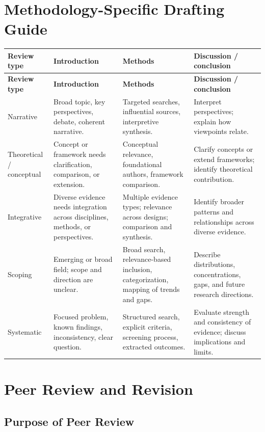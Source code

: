 \documentclass[10pt,letterpaper]{article}
\begin{document}
\section{Methodology-Specific Drafting Guide}

\begin{longtable}{L{3.0cm} L{3.25cm} L{3.55cm} L{3.55cm}}
\toprule
{}
\textbf{Review type} & \textbf{Introduction} & \textbf{Methods} & \textbf{Discussion / conclusion}\\
\midrule
\endfirsthead
\toprule
{}
\textbf{Review type} & \textbf{Introduction} & \textbf{Methods} & \textbf{Discussion / conclusion}\\
\midrule
\endhead
\bottomrule
\endfoot
Narrative & Broad topic, key perspectives, debate, coherent narrative. & Targeted searches, influential sources, interpretive synthesis. & Interpret perspectives; explain how viewpoints relate.\\
Theoretical / conceptual & Concept or framework needs clarification, comparison, or extension. & Conceptual relevance, foundational authors, framework comparison. & Clarify concepts or extend frameworks; identify theoretical contribution.\\
Integrative & Diverse evidence needs integration across disciplines, methods, or perspectives. & Multiple evidence types; relevance across designs; comparison and synthesis. & Identify broader patterns and relationships across diverse evidence.\\
Scoping & Emerging or broad field; scope and direction are unclear. & Broad search, relevance-based inclusion, categorization, mapping of trends and gaps. & Describe distributions, concentrations, gaps, and future research directions.\\
Systematic & Focused problem, known findings, inconsistency, clear question. & Structured search, explicit criteria, screening process, extracted outcomes. & Evaluate strength and consistency of evidence; discuss implications and limits.\\
\end{longtable}

\section{Peer Review and Revision}

\subsection{Purpose of Peer Review}
\end{document}
